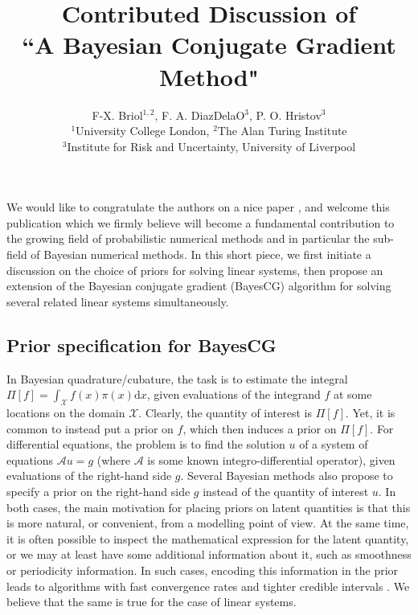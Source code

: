 \documentclass[twoside]{article}
\title{Contributed Discussion of \\``A Bayesian Conjugate Gradient Method"}
\author{F-X. Briol$^{1,2}$, F. A. DiazDelaO$^{3}$, P. O. Hristov$^{3}$\\ $^{1}$University College London, $^{2}$The Alan Turing Institute \\ $^{3}$Institute for Risk and Uncertainty, University of Liverpool}
\begin{document}
\maketitle


		We would like to congratulate the authors on a nice paper \citep{Cockayne2019}, and welcome this publication which we firmly believe will become a fundamental contribution to the growing field of probabilistic numerical methods and in particular the sub-field of Bayesian numerical methods. In this short piece, we first initiate a discussion on the choice of priors for solving linear systems, then propose an extension of the Bayesian conjugate gradient (BayesCG) algorithm for solving several related linear systems simultaneously.
		
	\subsection*{Prior specification for BayesCG}

		In Bayesian quadrature/cubature, the task is to estimate the integral $\Pi[f] = \int_{\mathcal{X}} f(x) \pi(x) \mathrm{d}x$, given evaluations of the integrand $f$ at some locations on the domain $\mathcal{X}$. Clearly, the quantity of interest is 
		$\Pi[f]$. Yet, it is common to instead put a prior on $f$, which then induces a prior on $\Pi[f]$. For differential equations, the problem is to find the solution $u$ of a system of equations $\mathcal{A} u =g$ (where $\mathcal{A}$ is some known integro-differential operator), given evaluations of the right-hand side $g$. Several Bayesian methods \citep{Cockayne2016,Chkrebtii2016} also propose to specify a prior on the right-hand side $g$ instead of the quantity of interest $u$.
		In both cases, the main motivation for placing priors on latent quantities is that this is more natural, or convenient, from a modelling point of view. At the same time, it is often possible to inspect the mathematical expression for the latent quantity, or we may at least have some additional information about it, such as smoothness or periodicity information. In such cases, encoding this information in the prior leads to algorithms with fast convergence rates and tighter credible intervals \cite{Cockayne2016,Briol2019PI}. We believe that the same is true for the case of linear systems.
		
\end{document}
